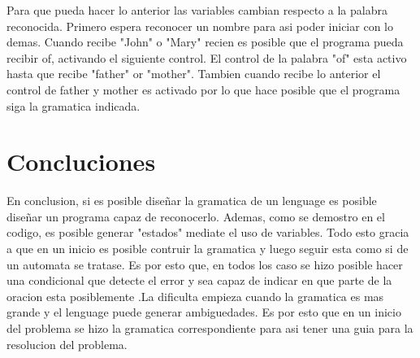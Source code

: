 \documentclass[conference]{IEEEtran}
\begin{document}
Para que pueda hacer lo anterior las variables cambian respecto a la palabra reconocida. Primero espera reconocer un nombre para asi poder iniciar con lo demas. Cuando recibe "John" o "Mary" recien es posible que el programa pueda recibir of, activando el siguiente control. El control de la palabra "of" esta activo hasta que recibe "father" or "mother". Tambien cuando recibe lo anterior el control de father y mother es activado por lo que hace posible que el programa siga la gramatica indicada.

\section{Concluciones}

En conclusion, si es posible diseñar la gramatica de un lenguage es posible diseñar un programa capaz de reconocerlo. Ademas, como se demostro en el codigo, es posible generar "estados" mediate el uso de variables. Todo esto gracia a que en un inicio es posible contruir la gramatica y luego seguir esta como si de un automata se tratase. Es por esto que, en todos los caso se hizo posible hacer una condicional que detecte el error y sea capaz de indicar en que parte de la oracion esta posiblemente .La dificulta empieza cuando la gramatica es mas grande y el lenguage puede generar ambiguedades. Es por esto que en un inicio del problema se hizo la gramatica correspondiente para asi tener una guia para la resolucion del problema. 
\end{document}
